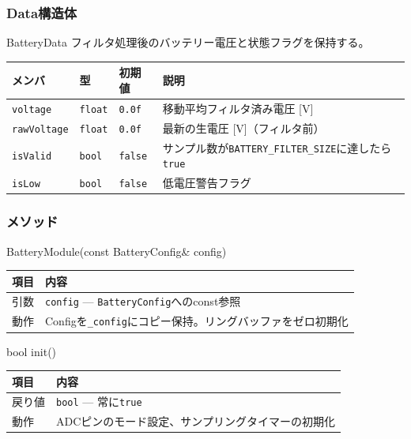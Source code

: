 \subsubsection{Data構造体}

\begin{funcblock}{BatteryData}
フィルタ処理後のバッテリー電圧と状態フラグを保持する。

\begin{longtable}{l l l p{4.8cm}}
\toprule
\textbf{メンバ} & \textbf{型} & \textbf{初期値} & \textbf{説明} \\
\midrule
\endhead
\texttt{voltage}    & \texttt{float} & \texttt{0.0f}  & 移動平均フィルタ済み電圧 [V] \\
\texttt{rawVoltage} & \texttt{float} & \texttt{0.0f}  & 最新の生電圧 [V]（フィルタ前） \\
\texttt{isValid}    & \texttt{bool}  & \texttt{false} & サンプル数が\texttt{BATTERY\_FILTER\_SIZE}に達したら\texttt{true} \\
\texttt{isLow}      & \texttt{bool}  & \texttt{false} & 低電圧警告フラグ \\
\bottomrule
\end{longtable}
\end{funcblock}

\subsubsection{メソッド}

\begin{funcblock}{BatteryModule(const BatteryConfig\& config)}
\begin{tabularx}{\textwidth}{l X}
\toprule
\textbf{項目} & \textbf{内容} \\
\midrule
引数   & \texttt{config} --- \texttt{BatteryConfig}へのconst参照 \\
動作   & Configを\texttt{\_config}にコピー保持。リングバッファをゼロ初期化 \\
\bottomrule
\end{tabularx}
\end{funcblock}

\begin{funcblock}{bool init()}
\begin{tabularx}{\textwidth}{l X}
\toprule
\textbf{項目} & \textbf{内容} \\
\midrule
戻り値   & \texttt{bool} --- 常に\texttt{true} \\
動作     & ADCピンのモード設定、サンプリングタイマーの初期化 \\
\bottomrule
\end{tabularx}
\end{funcblock}

